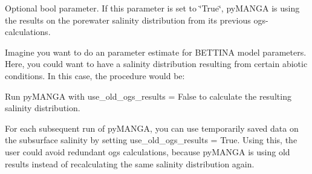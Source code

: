 Optional bool parameter. If this parameter is set to \char`\"{}\+True\char`\"{}, py\+MANGA is using the results on the porewater salinity distribution from its previous ogs-\/calculations.

Imagine you want to do an parameter estimate for BETTINA model parameters. Here, you could want to have a salinity distribution resulting from certain abiotic conditions. In this case, the procedure would be\+:


\begin{DoxyEnumerate}
\item Run py\+MANGA with use\+\_\+old\+\_\+ogs\+\_\+results = False to calculate the resulting salinity distribution.
\item For each subsequent run of py\+MANGA, you can use temporarily saved data on the subsurface salinity by setting use\+\_\+old\+\_\+ogs\+\_\+results = True. Using this, the user could avoid redundant ogs calculations, because py\+MANGA is using old results instead of recalculating the same salinity distribution again. 
\end{DoxyEnumerate}